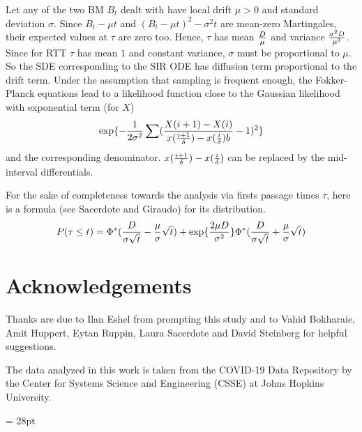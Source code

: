 \documentclass{article}
\begin{document}
\noindent Let any of the two BM $B_t$ dealt with have local drift $\mu>0$ and standard deviation $\sigma$. Since $B_t - \mu t$ and $(B_t - \mu t)^2 - \sigma^2 t$ are mean-zero Martingales, their expected values at $\tau$ are zero too. Hence, $\tau$ has mean ${D \over \mu}$ and variance ${{\sigma^2 D} \over {\mu^3}}$. Since for RTT $\tau$ has mean $1$ and constant variance, $\sigma$ must be proportional to $\mu$. So the SDE corresponding to the SIR ODE has diffusion term proportional to the drift term. Under the assumption that sampling is frequent enough, the Fokker-Planck equations lead to a likelihood function close to the Gaussian likelihood with exponential term (for $X$)
$$
\exp\{-{1 \over {2 \sigma^2}}\sum ({{X(i+1)-X(i)} \over {{x({{i+1} \over \delta})-x({{i} \over \delta})}b}}-1)^2\}
$$
and the corresponding denominator. ${{x({{i+1} \over \delta})-x({{i} \over \delta})}}$ can be replaced by the mid-interval differentials.

\bigskip

\noindent For the sake of completeness towards the analysis via firsts passage times $\tau$, here is a formula (see Sacerdote and Giraudo) for its distribution.
$$
P(\tau \le t) = \Phi^*({D \over {\sigma \sqrt{t}}} - {\mu \over \sigma} \sqrt{t}) + \exp\{{{2 \mu D} \over \sigma^2}\} \Phi^*({D \over {\sigma \sqrt{t}}} + {\mu \over \sigma} \sqrt{t})
$$


\section*{Acknowledgements}

Thanks are due to Ilan Eshel from prompting this study and to Vahid
Bokharaie, Amit Huppert, Eytan Ruppin, Laura Sacerdote and David Steinberg for helpful suggestions.

The data analyzed in this work is taken from the COVID-19 Data Repository by
the Center for Systems Science and Engineering (CSSE) at Johns Hopkins
University.


\baselineskip= 28pt
\end{document}
